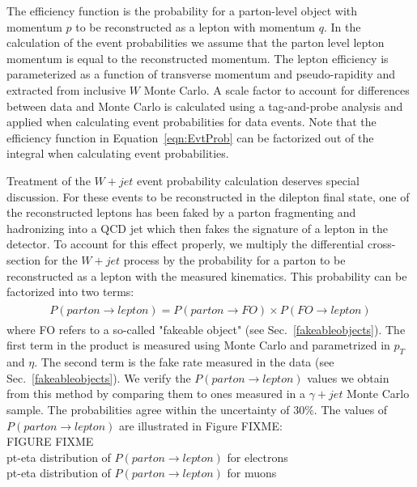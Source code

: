 The efficiency function is the probability for a parton-level object with momentum 
$p$ to be reconstructed as a lepton with momentum $q$. In the calculation of the event 
probabilities we assume that the parton level lepton momentum is equal to the reconstructed 
momentum. The lepton efficiency is parameterized as a function of transverse momentum and 
pseudo-rapidity and extracted from inclusive $W$ Monte Carlo. A scale factor to account for
differences between data and Monte Carlo is
calculated using a tag-and-probe analysis and applied when calculating event probabilities 
for data events.
Note that the efficiency function in Equation~\ref{eqn:EvtProb} can be factorized out of
the integral when calculating event probabilities.

Treatment of the $W+jet$ event probability calculation deserves special discussion.
For these events to be reconstructed in the dilepton final state,
one of the reconstructed leptons has been faked by a parton fragmenting and hadronizing 
into a QCD jet which then fakes the signature of a lepton in the detector. To account for this 
effect properly, we multiply the differential cross-section for the $W+jet$ process by the 
probability for a parton to be reconstructed as a lepton with the measured kinematics. 
This probability can be factorized into two terms:
\begin{eqnarray}
\begin{array}{lcl}
P(parton\rightarrow lepton)=P(parton\rightarrow FO)\times P(FO\rightarrow lepton)
\end{array} 
\end{eqnarray} 
where FO refers to a so-called "fakeable object" (see Sec.~\ref{fakeableobjects}).
The first term in the product is measured using Monte Carlo and parametrized
in $p_{T}$ and $\eta$.  The second term is the fake rate measured in the data
(see Sec.~\ref{fakeableobjects}).
We verify the $P(parton\rightarrow lepton)$ values we obtain from this method by comparing them to ones measured in a $\gamma+jet$ Monte Carlo sample.  The probabilities agree within the uncertainty of $30\%$.  The values of $P(parton\rightarrow lepton)$ are illustrated in Figure FIXME:
\\
FIGURE FIXME\\
pt-eta distribution of  $P(parton\rightarrow lepton)$ for electrons\\
pt-eta distribution of  $P(parton\rightarrow lepton)$ for muons\\

